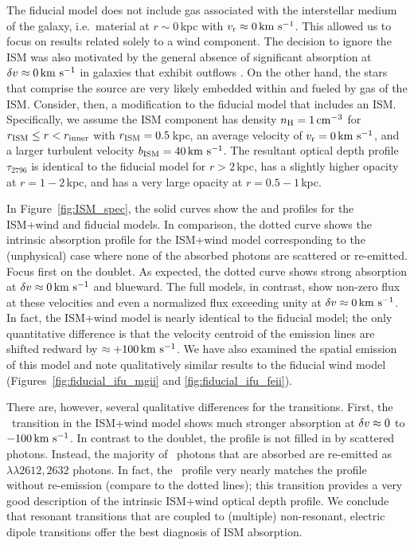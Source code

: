 \documentclass[12pt,preprint]{aastex}
\begin{document}
The fiducial model does not include gas associated with
the interstellar medium of the galaxy, i.e.\ material at $r \sim
0$\,kpc with $v_{\rm r} \approx 0 \, {\rm km~s^{-1}}$.  This allowed us to focus on
results related solely to a wind component.  The decision to ignore the ISM
was also motivated by the general absence of significant absorption at
$\delta v \approx 0 \, {\rm km~s^{-1}}$ in galaxies that exhibit outflows 
\citep[e.g.][]{wcp+09,rwk+10,steidel+10}.
On the other hand, the stars that comprise the
source are very likely embedded within and fueled by gas
of the ISM.  
Consider, then, a modification to the fiducial model that 
includes an ISM. 
Specifically, we assume the ISM component has density $n_{\rm H} = 1 \, {\rm cm^{-3}}$ for
$r_{\rm ISM} \le r < r_{\rm inner}$ with $r_{\rm ISM} = 0.5$\,kpc, 
an average velocity of $v_{\rm r} = 0 \, {\rm km~s^{-1}}$, and a larger turbulent velocity $b_{\rm ISM} = 40 \, {\rm km~s^{-1}}$.
The resultant optical depth profile $\tau_{2796}$ is identical to the
fiducial model for $r > 2$\,kpc, has a slightly higher opacity at
$r=1-2$\,kpc, and has a very large opacity at $r = 0.5-1$\,kpc.

In Figure~\ref{fig:ISM_spec}, the solid curves show the  and
 profiles for the ISM+wind and fiducial 
models. In comparison, the
dotted curve shows the intrinsic absorption profile for the ISM+wind
model corresponding to the (unphysical) case
where none of the absorbed photons are scattered or re-emitted.   Focus first on the
 doublet.  As expected, the dotted curve shows strong
absorption at $\delta v \approx 0 \, {\rm km~s^{-1}}$ and blueward.  The full models,
in contrast, show non-zero flux at these velocities and even a
normalized flux exceeding unity at $\delta v \approx 0 \, {\rm km~s^{-1}}$.  In
fact, the ISM+wind model is nearly identical to the fiducial model;
the only quantitative difference is that the velocity centroid of
the emission lines are shifted redward by $\approx +100 \, {\rm km~s^{-1}}$.
We have also examined the spatial emission of this model and note
qualitatively similar results to the fiducial wind model
(Figures~\ref{fig:fiducial_ifu_mgii} and \ref{fig:fiducial_ifu_feii}).

There are, however, several qualitative differences 
for the  transitions. 
First, the \feiia\ transition in the ISM+wind model
shows much stronger absorption at $\delta v \approx 0$
to $-100 \, {\rm km~s^{-1}}$.  In contrast to the  doublet,
the profile is not filled in by scattered photons. Instead, 
the majority of \feiia\ photons that are absorbed are re-emitted as
\feiis$\lambda\lambda 2612, 2632$ photons.  In fact, the
\feiia\ profile very nearly matches the profile without re-emission 
(compare to the dotted lines); this transition provides a
very good description of the intrinsic ISM+wind optical depth profile.  
We conclude that resonant transitions that are coupled to (multiple)
non-resonant, electric dipole transitions offer the best
diagnosis of ISM absorption.
\end{document}
